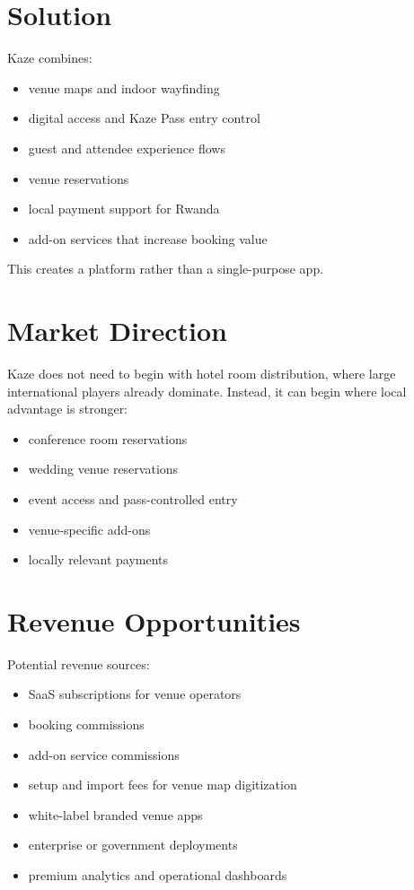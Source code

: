 \documentclass[11pt,a4paper]{article}
\begin{document}
\section{Solution}

Kaze combines:
\begin{itemize}
    \item venue maps and indoor wayfinding
    \item digital access and Kaze Pass entry control
    \item guest and attendee experience flows
    \item venue reservations
    \item local payment support for Rwanda
    \item add-on services that increase booking value
\end{itemize}

This creates a platform rather than a single-purpose app.

\section{Market Direction}

Kaze does not need to begin with hotel room distribution, where large international players already dominate. Instead, it can begin where local advantage is stronger:
\begin{itemize}
    \item conference room reservations
    \item wedding venue reservations
    \item event access and pass-controlled entry
    \item venue-specific add-ons
    \item locally relevant payments
\end{itemize}

\section{Revenue Opportunities}

Potential revenue sources:
\begin{itemize}
    \item SaaS subscriptions for venue operators
    \item booking commissions
    \item add-on service commissions
    \item setup and import fees for venue map digitization
    \item white-label branded venue apps
    \item enterprise or government deployments
    \item premium analytics and operational dashboards
\end{itemize}
\end{document}
